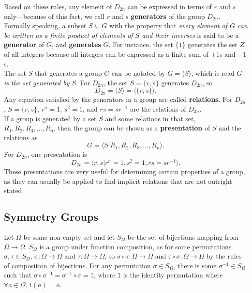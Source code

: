 \documentclass[12pt,letterpaper]{article}
\begin{document}
Based on these rules, any element of $D_{2n}$ can be expressed in terms of $r$ and $s$ only---because of this fact, we call $r$ and $s$ \textbf{generators} of the group $D_{2n}$. Formally speaking, a subset $S \subseteq G$ with the property that \textit{every element of $G$ can be written as a finite product of elements of $S$ and their inverses} is said to be a \textbf{generator} of $G$, and \textbf{generates} $G$. For instance, the set $\{1\}$ generates the set $Z$ of all integers because all integers can be expressed as a finite sum of $+1$s and $-1$s. \\

The set $S$ that generates a group $G$ can be notated by $G=\langle S\rangle$, which is read \textit{$G$ is the set generated by $S$}. For $D_{2n}$, the set $S = \{r, s\}$ generates $D_{2n}$, so $$D_{2n} = \langle S \rangle = \langle \{r, s\} \rangle.$$ Any equation satisfied by the generators in a group are called \textbf{relations}. For $D_{2n}$, $S = \{r, s\}$, $r^{n} = 1$, $s^{2} = 1$, and $rs = sr^{-1}$ are the relations of $D_{2n}$. \\

If a group is generated by a set $S$ and some relations in that set, $R_{1}, R_{2}, R_{3}, ..., R_{n}$, then the group can be shown as a \textbf{presentation} of $S$ and the relations as $$G = \langle S | R_{1}, R_{2}, R_{3}, ..., R_{n} \rangle.$$ For $D_{2n}$, one presentation is $$D_{2n} = \langle r, s | r^{n} = 1, s^{2} = 1, rs = sr^{-1} \rangle.$$ These presentations are very useful for determining certain properties of a group, as they can usually be applied to find implicit relations that are not outright stated.

\subsection{Symmetry Groups}

Let $\Omega$ be some non-empty set and let $S_{\Omega}$ be the set of bijections mapping from $\Omega \rightarrow \Omega$. $S_{\Omega}$ is a group under function composition, as for some permutations $\sigma, \tau \in S_{\Omega}$, $\sigma: \Omega \rightarrow \Omega$ and $\tau: \Omega \rightarrow \Omega$, so $\sigma \circ \tau: \Omega \rightarrow \Omega$ and  $\tau \circ \sigma: \Omega \rightarrow \Omega$ by the rules of composition of bijections. For any permutation $\sigma \in S_{\Omega}$, there is some $\sigma^{-1} \in S_{\Omega}$ such that $\sigma \circ \sigma^{-1} = \sigma^{-1} \circ \sigma = 1$, where $1$ is the identity permutation where $\forall a \in \Omega, 1(a) = a$. \\
\end{document}
